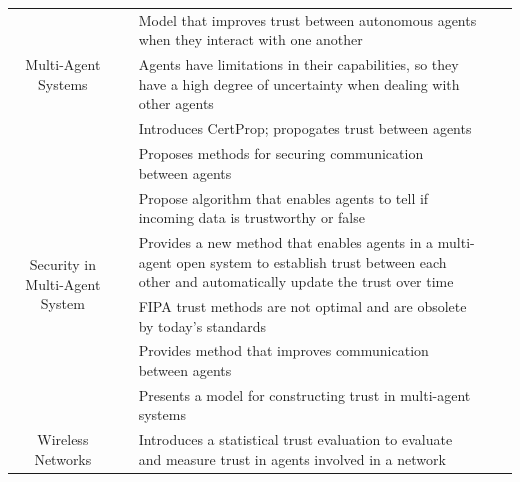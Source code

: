 \documentclass[runningheads,a4paper]{llncs}
\begin{document}
\begin{longtable}{|c|c|p{5cm}|p{3cm}|p{1cm}|}
	\multirow{3}{*}{Multi-Agent Systems }
	& \cite{hang2008adaptive}     
	& Model that improves trust between autonomous agents when they interact with one another                       
	&                                 
	&                       
	\\ \cline{2-5}
	& \cite{ramchurn2004trust}
	& Agents have limitations in their capabilities, so they have a high degree of uncertainty when dealing with other agents                     
	&                                 
	&                       
	\\ \cline{2-5} 
	& \cite{hang2009operators}
	& Introduces CertProp; propogates trust between agents                      
	&                                 
	&                       
	\\ \hline
	\multirow{6}{*}{Security in Multi-Agent System}
	& \cite{wong2000adding} 
	& Proposes methods for securing communication between agents                
	&                                 
	&                       
	\\ \cline{2-5} 
	& \cite{barber2001belief}
	& Propose algorithm that enables agents to tell if incoming data is trustworthy or false          
	&                                 
	&                       
	\\ \cline{2-5}
	& \cite{mass2001distributed}
	& Provides a new method that enables agents in a multi-agent open system to establish trust between each other and automatically update the trust over time           
	&                                 
	&                       
	\\ \cline{2-5} 
	& \cite{poslad2000towards}
	& FIPA trust methods are not optimal and are obsolete by today's standards                         
	&                                 
	&                       
	\\ \cline{2-5}
	& \cite{gmytrasiewicz1993toward}  
	& Provides method that improves communication between agents                        
	&                                 
	&                       
	\\ \cline{2-5} 
	& \cite{jiang2005autonomous}
	& Presents a model for constructing trust in multi-agent systems                         
	&                                 
	&                       
	\\ \hline
	
	\multirow{1}{*}{Wireless Networks}
	& \cite{jiang2006trust}
	& Introduces a statistical trust evaluation to evaluate and measure trust in agents involved in a network       
	&                                 
	&                       
	\\ \hline
	

\end{longtable}
\end{document}
